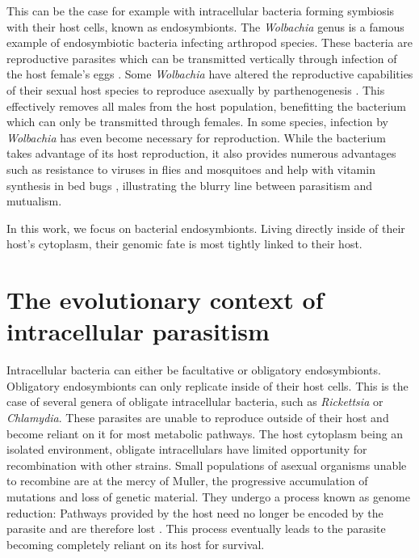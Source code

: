 This can be the case for example with intracellular bacteria forming symbiosis with their host cells, known as endosymbionts. The \textit{Wolbachia} genus is a famous example of endosymbiotic bacteria infecting arthropod species. These bacteria are reproductive parasites which can be transmitted vertically through infection of the host female's eggs \cite{knightMeetHerodBug2001}. Some \textit{Wolbachia} have altered the reproductive capabilities of their sexual host species to reproduce asexually by \Gls{parthenogenesis} \cite{stouthamerMolecularIdentificationMicroorganisms1993}. This effectively removes all males from the host population, benefitting the bacterium which can only be transmitted through females. In some species, infection by \textit{Wolbachia} has even become necessary for reproduction. While the bacterium takes advantage of its host reproduction, it also provides numerous advantages such as resistance to viruses in flies and mosquitoes \citep{hedgesWolbachiaVirusProtection2008,teixeiraBacterialSymbiontWolbachia2008} and help with vitamin synthesis in bed bugs \cite{nikohEvolutionaryOriginInsectWolbachia2014}, illustrating the blurry line between parasitism and mutualism.

In this work, we focus on bacterial endosymbionts. Living directly inside of their host's cytoplasm, their genomic fate is most tightly linked to their host.

\section{The evolutionary context of intracellular parasitism}

Intracellular bacteria can either be facultative or obligatory endosymbionts. Obligatory endosymbionts can only replicate inside of their host cells. This is the case of several genera of obligate intracellular bacteria, such as \textit{Rickettsia} or \textit{Chlamydia}. These parasites are unable to reproduce outside of their host and become reliant on it for most metabolic pathways. The host cytoplasm being an isolated environment, obligate intracellulars have limited opportunity for recombination with other strains. Small populations of asexual organisms unable to recombine are at the mercy of \Gls{Muller}, the progressive accumulation of mutations and loss of genetic material. They undergo a process known as genome reduction: Pathways provided by the host need no longer be encoded by the parasite and are therefore lost \cite{mccutcheonExtremeGenomeReduction2012}. This process eventually leads to the parasite becoming completely reliant on its host for survival.

